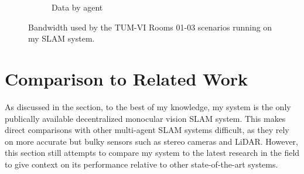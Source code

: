 \begin{figure}[h]
\begin{subfigure}[b]{0.45\linewidth}
        \caption{Data by agent}
    \end{subfigure}%

    \caption{Bandwidth used by the TUM-VI Rooms 01-03 scenarios running on my SLAM system.}
    \label{fig:tum-rooms-01-03-bandwith}
\end{figure}

\section{Comparison to Related Work}
\label{sec:comparison-to-related-work}

As discussed in the  section, to the best of my knowledge, my system is the only publically available decentralized monocular vision SLAM system. This makes direct comparisons with other multi-agent SLAM systems difficult, as they rely on more accurate but bulky sensors such as stereo cameras and LiDAR. However, this section still attempts to compare my system to the latest research in the field to give context on its performance relative to other state-of-the-art systems.

